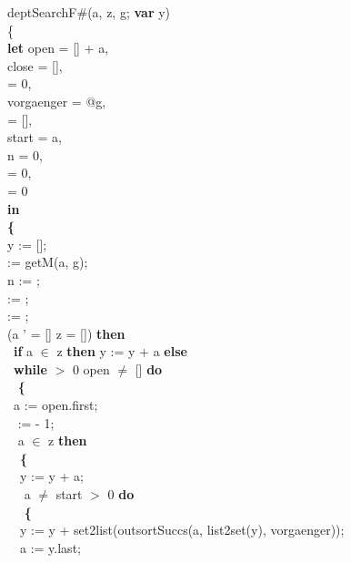 \documentclass[a4paper]{article}
\begin{document}
deptSearchF\#(a, z, g; {\bf var} y) \\
\{\\
{\bf let} open = [] + a,\\
 close = [],\\
  = 0,\\
 vorgaenger = @g,\\
  = [],\\
 start = a,\\
 n = 0,\\
  = 0,\\
  = 0\\
 {\bf in}\\
 {\bf \{}\\
\tabbe y := [];\\
\tabbe {} := getM(a, g);\\
\tabbe n := ;\\
\tabbe {} := ;\\
\tabbe {} := ;\\
 \Not (a ' = [] \Or z = []) {\bf then}\\
\tabbe \tabif\  {\bf if} a $\in$ z {\bf then} y := y + a {\bf else}\\
\tabbe \tabif\  {\bf while}  $>$ 0 \And open $\neq$ [] {\bf do}\\
\tabbe \tabif\  {\bf \{}\\
\tabbe \tabif\ \tabbe a := open.first;\\
\tabbe \tabif\ \tabbe {} :=  - 1;\\
\tabbe \tabif\  a $\in$ z {\bf then}\\
\tabbe \tabif\ \tabbe \tabif\  {\bf \{}\\
\tabbe \tabif\ \tabbe \tabif\ \tabbe y := y + a;\\
\tabbe \tabif\ \tabbe \tabif\  a $\neq$ start \And {} $>$ 0 {\bf do}\\
\tabbe \tabif\ \tabbe \tabif\ \tabbe {} {\bf \{}\\
\tabbe \tabif\ \tabbe \tabif\ \tabbe {}\tabbe y := y + set2list(outsortSuccs(a, list2set(y), vorgaenger));\\
\tabbe \tabif\ \tabbe \tabif\ \tabbe {}\tabbe a := y.last;\\
\end{document}
